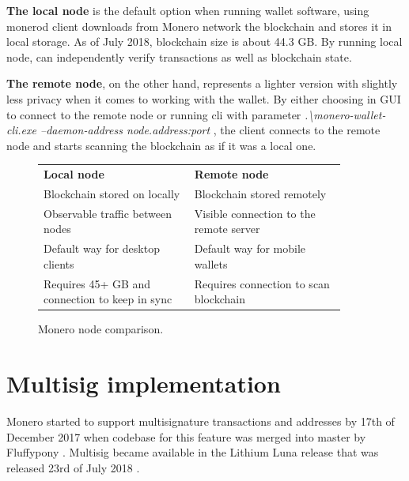 \documentclass[
  printed, %
  table,   %
  lof,     %
  lot,     %
           oneside, color
]{fithesis3}
\begin{document}
\textbf{The local node} is the default option when running wallet software, using monerod client downloads from Monero network the blockchain and stores it in local storage. As of July 2018, blockchain size is about 44.3 GB. By running local node, can independently verify transactions as well as blockchain state.

\textbf{The remote node}, on the other hand, represents a lighter version with slightly less privacy when it comes to working with the wallet. By either choosing in GUI to connect to the remote node or running cli with parameter \textit{.\textbackslash monero-wallet-cli.exe --daemon-address node.address:port} , the client connects to the remote node and starts scanning the blockchain as if it was a local one.

\begin{figure}[H]
\center
\begin{tabular}{p{0.45\linewidth}p{0.45\linewidth}}
\textbf{Local node}                                                          & \textbf{Remote node}                                \\
Blockchain stored on locally                                           & Blockchain stored remotely                          \\
Observable traffic between nodes                                             & Visible connection to the remote server                 \\
Default way for desktop clients                                              & Default way for mobile wallets \\
Requires 45+ GB and connection to keep in sync                               & Requires connection to scan blockchain             
\end{tabular}
\caption{Monero node comparison.}
\label{table:moneronodes}
\end{figure}
\newpage
\section{Multisig implementation}

Monero started to support multisignature transactions and addresses by 17th of December 2017 when codebase for this feature was merged into master by Fluffypony \cite{moneromultisig}. Multisig became available in the Lithium Luna release that was released 23rd of July 2018 \cite{moneromultisigrelease}.
\end{document}
